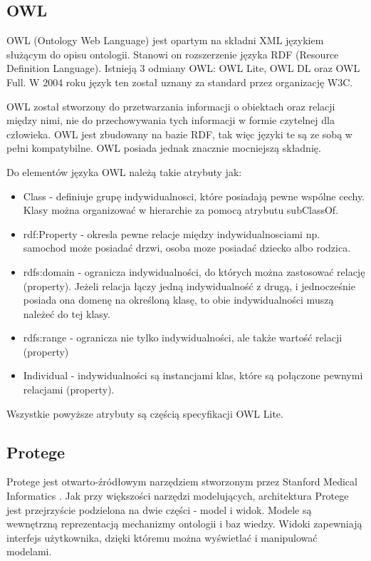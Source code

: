 \subsection{OWL}
\label{sec:owl}

OWL (Ontology Web Language) jest opartym na składni XML językiem służącym do opisu ontologii. Stanowi on rozszerzenie języka RDF (Resource Definition Language). Istnieją 3 odmiany OWL: OWL Lite, OWL DL oraz OWL Full. W 2004 roku język ten został uznany za standard przez organizację W3C.

OWL został stworzony do przetwarzania informacji o obiektach oraz relacji między nimi, nie do przechowywania tych informacji w formie czytelnej dla człowieka. OWL jest zbudowany na bazie RDF, tak więc języki te są ze sobą w pełni kompatybilne. OWL posiada jednak znacznie mocniejszą składnię.

Do elementów języka OWL należą takie atrybuty jak:

\begin{itemize}

\item Class - definiuje grupę indywidualnosci, które posiadają pewne wspólne cechy. Klasy można organizować w hierarchie za pomocą atrybutu subClassOf.


\item rdf:Property - okresla pewne relacje między indywidualnosciami np. samochod może posiadać drzwi, osoba moze posiadać dziecko albo rodzica.

\item rdfs:domain - ogranicza indywidualności, do których można zastosować relację (property). Jeżeli relacja łączy jedną indywidualność z drugą, i jednocześnie posiada ona domenę na określoną klasę, to obie indywidualności muszą należeć do tej klasy.

\item rdfs:range - ogranicza nie tylko indywidualności, ale także wartość relacji (property)

\item Individual - indywidualności są instancjami klas, które są połączone pewnymi relacjami (property).

\end{itemize}

Wszystkie powyższe atrybuty są częścią specyfikacji OWL Lite.

\subsection{Protege}
\label{sec:protege}
Protege jest otwarto-źródłowym narzędziem stworzonym przez Stanford Medical Informatics \cite{26}. Jak przy większości narzędzi modelujących, architektura Protege jest przejrzyście podzielona na dwie części - model i widok. Modele są wewnętrzną reprezentacją mechanizmy ontologii i baz wiedzy. Widoki zapewniają interfejs użytkownika, dzięki któremu można wyświetlać i manipulować modelami.

